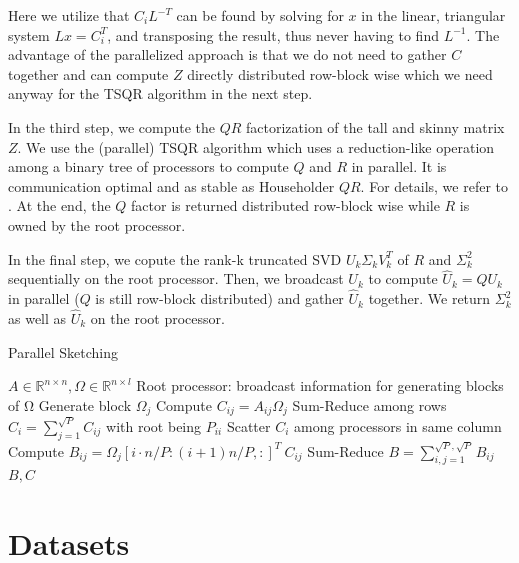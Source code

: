 \documentclass{article}
\theoremstyle{definition}
\begin{document}
Here we utilize that $C_i L^{-T}$ can be found by solving for $x$ in the linear, triangular system $Lx=C_i^T$, and transposing the result, thus never having to find $L^{-1}$. The advantage of the parallelized approach is that we do not need to gather $C$ together and can compute $Z$ directly distributed row-block wise which we need anyway for the TSQR algorithm in the next step.

In the third step, we compute the $QR$ factorization of the tall and skinny matrix $Z$. We use the (parallel) TSQR algorithm which uses a reduction-like operation among a binary tree of processors to compute $Q$ and $R$ in parallel. It is communication optimal and as stable as Householder $QR$. For details, we refer to \cite{demmel2008}. At the end, the $Q$ factor is returned distributed row-block wise while $R$ is owned by the root processor.

In the final step, we copute the rank-k truncated SVD $U_k \Sigma_k V_k^T$ of $R$ and $\Sigma_k^2$ sequentially on the root processor. Then, we broadcast $U_k$ to compute $\hat{U}_k = Q U_k$ in parallel ($Q$ is still row-block distributed) and gather $\hat{U}_k$ together. We return $\Sigma_k^2$ as well as $\hat{U}_k$ on the root processor.

\begin{algorithm}[t]
    \caption{Parallel Sketching} \label{algo:sketching}
    \begin{algorithmic}[1]
        \Require $A \in \mathbb{R}^{n \times n}, \Omega \in \mathbb{R}^{n \times l}$
        \State Root processor: broadcast information for generating blocks of Ω
            \State Generate block $\Omega_j$
            \State Compute $C_{ij} = A_{ij} \Omega_j$
            \State Sum-Reduce among rows $C_i = \sum_{j = 1}^{\sqrt{P}} C_{ij}$ with root being $P_{ii}$
            \State Scatter $C_i$ among processors in same column
            \State Compute $B_{ij} = \Omega_j[i \cdot n/P : (i+1) n/P, :]^T \ C_{ij}$
        \EndFor
        \State Sum-Reduce $B = \sum_{i,j = 1}^{\sqrt{P}, \sqrt{P}} B_{ij}$
        \Ensure $B, C$
    \end{algorithmic}
\end{algorithm}

\section{Datasets}\label{sec:datasets}
\end{document}
